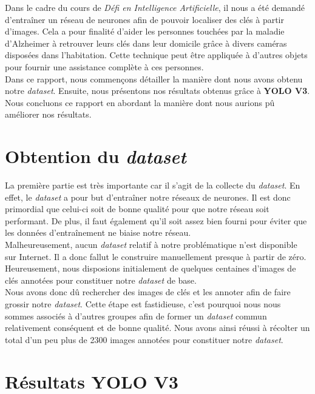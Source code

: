 \documentclass[10pt,a4paper]{article}
\begin{document}
   		Dans le cadre du cours de \textit{Défi en Intelligence Artificielle}, il nous a été demandé d'entraîner un réseau de neurones afin de pouvoir localiser des clés à partir d'images. Cela a pour finalité d'aider les personnes touchées par la maladie d'Alzheimer à retrouver leurs clés dans leur domicile grâce à divers caméras disposées dans l'habitation. Cette technique peut être appliquée à d'autres objets pour fournir une assistance complète à ces personnes.\\
   		
   		Dans ce rapport, nous commençons détailler la manière dont nous avons obtenu notre \textit{dataset}. Ensuite, nous présentons nos résultats obtenus grâce à \textbf{YOLO V3}. Nous concluons ce rapport en abordant la manière dont nous aurions pû améliorer nos résultats. 
   	
   	\section{Obtention du \textit{dataset}}
   	
   		La première partie est très importante car il s'agit de la collecte du \textit{dataset}. En effet, le \textit{dataset} a pour but d'entraîner notre réseaux de neurones. Il est donc primordial que celui-ci soit de bonne qualité pour que notre réseau soit performant. De plus, il faut également qu'il soit assez bien fourni pour éviter que les données d'entraînement ne biaise notre réseau.\\
   		
   		Malheureusement, aucun \textit{dataset} relatif à notre problématique n'est disponible sur Internet. Il a donc fallut le construire manuellement presque à partir de zéro. Heureusement, nous disposions initialement de quelques centaines d'images de clés annotées pour constituer notre \textit{dataset} de base.\\
   		
   		Nous avons donc dû rechercher des images de clés et les annoter afin de faire grossir notre \textit{dataset}. Cette étape est fastidieuse, c'est pourquoi nous nous sommes associés à d'autres groupes afin de former un \textit{dataset} commun relativement conséquent et de bonne qualité. Nous avons ainsi réussi à récolter un total d'un peu plus de 2300 images annotées pour constituer notre \textit{dataset}.
   		
   	\newpage
   	
   	\section{Résultats \textbf{YOLO V3}}
   	
\end{document}
